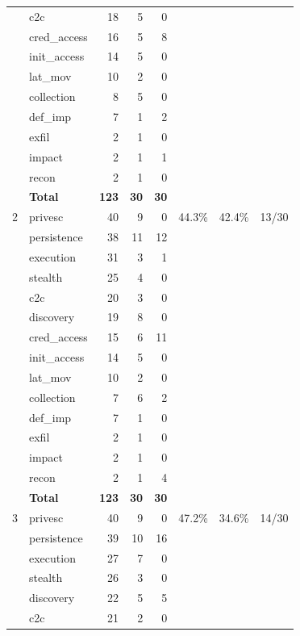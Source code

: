 \documentclass[10pt]{article}
\begin{document}
\begin{table}[!ht]
\begin{minipage}[t]{0.45\textwidth}
{\begin{tabular}{c l r r r r r r}
  & c2c          & 18  & 5  & 0  & & & \\
  & cred\_access & 16  & 5  & 8  & & & \\
  & init\_access & 14  & 5  & 0  & & & \\
  & lat\_mov     & 10  & 2  & 0  & & & \\
  & collection   & 8   & 5  & 0  & & & \\
  & def\_imp     & 7   & 1  & 2  & & & \\
  & exfil        & 2   & 1  & 0  & & & \\
  & impact       & 2   & 1  & 1  & & & \\
  & recon        & 2   & 1  & 0  & & & \\
  & \textbf{Total} & \textbf{123} & \textbf{30} & \textbf{30} & & & \\
\midrule
2 & privesc      & 40  & 9  & 0  & 44.3\% & 42.4\% & 13/30 \\
  & persistence  & 38  & 11 & 12 & & & \\
  & execution    & 31  & 3  & 1  & & & \\
  & stealth      & 25  & 4  & 0  & & & \\
  & c2c          & 20  & 3  & 0  & & & \\
  & discovery    & 19  & 8  & 0  & & & \\
  & cred\_access & 15  & 6  & 11 & & & \\
  & init\_access & 14  & 5  & 0  & & & \\
  & lat\_mov     & 10  & 2  & 0  & & & \\
  & collection   & 7   & 6  & 2  & & & \\
  & def\_imp     & 7   & 1  & 0  & & & \\
  & exfil        & 2   & 1  & 0  & & & \\
  & impact       & 2   & 1  & 0  & & & \\
  & recon        & 2   & 1  & 4  & & & \\
  & \textbf{Total} & \textbf{123} & \textbf{30} & \textbf{30} & & & \\
\midrule
3 & privesc      & 40  & 9  & 0  & 47.2\% & 34.6\% & 14/30 \\
  & persistence  & 39  & 10 & 16 & & & \\
  & execution    & 27  & 7  & 0  & & & \\
  & stealth      & 26  & 3  & 0  & & & \\
  & discovery    & 22  & 5  & 5  & & & \\
  & c2c          & 21  & 2  & 0  & & & \\

\end{tabular}}
\end{minipage}
\end{table}
\end{document}
